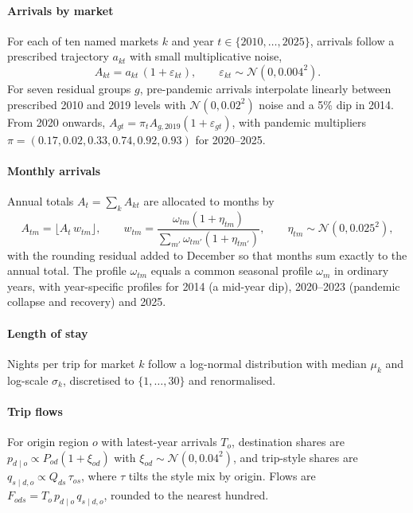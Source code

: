 \documentclass[11pt,a4paper]{article}
\begin{document}
\paragraph{Arrivals by market}
For each of ten named markets $k$ and year $t \in \{2010,\dots,2025\}$, arrivals follow a prescribed
trajectory $a_{kt}$ with small multiplicative noise,
\begin{equation}
A_{kt} = a_{kt}\,(1 + \varepsilon_{kt}), \qquad \varepsilon_{kt} \sim \mathcal{N}(0, 0.004^2).
\end{equation}
For seven residual groups $g$, pre-pandemic arrivals interpolate linearly between prescribed 2010 and 2019
levels with $\mathcal{N}(0, 0.02^2)$ noise and a 5\% dip in 2014. From 2020 onwards,
$A_{gt} = \pi_t A_{g,2019}(1+\varepsilon_{gt})$, with pandemic multipliers
$\pi = (0.17, 0.02, 0.33, 0.74, 0.92, 0.93)$ for 2020--2025.

\paragraph{Monthly arrivals}
Annual totals $A_t = \sum_k A_{kt}$ are allocated to months by
\begin{equation}
A_{tm} = \lfloor A_t\, w_{tm} \rfloor, \qquad
w_{tm} = \frac{\omega_{tm}(1+\eta_{tm})}{\sum_{m'} \omega_{tm'}(1+\eta_{tm'})}, \qquad
\eta_{tm} \sim \mathcal{N}(0, 0.025^2),
\end{equation}
with the rounding residual added to December so that months sum exactly to the annual total. The profile
$\omega_{tm}$ equals a common seasonal profile $\omega_m$ in ordinary years, with year-specific profiles for
2014 (a mid-year dip), 2020--2023 (pandemic collapse and recovery) and 2025.

\paragraph{Length of stay}
Nights per trip for market $k$ follow a log-normal distribution with median $\mu_k$ and log-scale
$\sigma_k$, discretised to $\{1,\dots,30\}$ and renormalised.

\paragraph{Trip flows}
For origin region $o$ with latest-year arrivals $T_o$, destination shares are
$p_{d\mid o} \propto P_{od}(1+\xi_{od})$ with $\xi_{od} \sim \mathcal{N}(0, 0.04^2)$, and trip-style shares
are $q_{s\mid d,o} \propto Q_{ds}\,\tau_{os}$, where $\tau$ tilts the style mix by origin. Flows are
$F_{ods} = T_o\, p_{d\mid o}\, q_{s\mid d,o}$, rounded to the nearest hundred.
\end{document}
